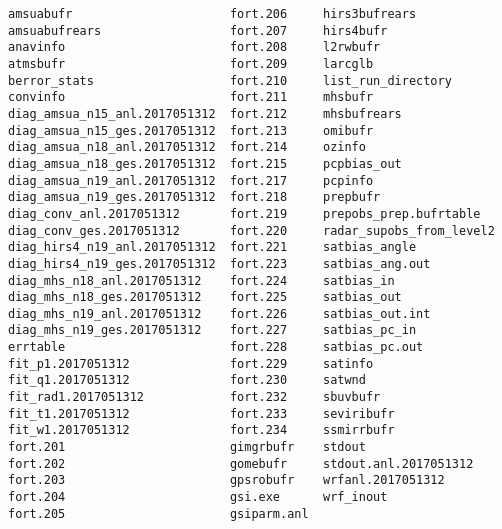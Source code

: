 \begin{scriptsize}
\begin{verbatim}
amsuabufr                      fort.206     hirs3bufrears
amsuabufrears                  fort.207     hirs4bufr
anavinfo                       fort.208     l2rwbufr
atmsbufr                       fort.209     larcglb
berror_stats                   fort.210     list_run_directory
convinfo                       fort.211     mhsbufr
diag_amsua_n15_anl.2017051312  fort.212     mhsbufrears
diag_amsua_n15_ges.2017051312  fort.213     omibufr
diag_amsua_n18_anl.2017051312  fort.214     ozinfo
diag_amsua_n18_ges.2017051312  fort.215     pcpbias_out
diag_amsua_n19_anl.2017051312  fort.217     pcpinfo
diag_amsua_n19_ges.2017051312  fort.218     prepbufr
diag_conv_anl.2017051312       fort.219     prepobs_prep.bufrtable
diag_conv_ges.2017051312       fort.220     radar_supobs_from_level2
diag_hirs4_n19_anl.2017051312  fort.221     satbias_angle
diag_hirs4_n19_ges.2017051312  fort.223     satbias_ang.out
diag_mhs_n18_anl.2017051312    fort.224     satbias_in
diag_mhs_n18_ges.2017051312    fort.225     satbias_out
diag_mhs_n19_anl.2017051312    fort.226     satbias_out.int
diag_mhs_n19_ges.2017051312    fort.227     satbias_pc_in
errtable                       fort.228     satbias_pc.out
fit_p1.2017051312              fort.229     satinfo
fit_q1.2017051312              fort.230     satwnd
fit_rad1.2017051312            fort.232     sbuvbufr
fit_t1.2017051312              fort.233     seviribufr
fit_w1.2017051312              fort.234     ssmirrbufr
fort.201                       gimgrbufr    stdout
fort.202                       gomebufr     stdout.anl.2017051312
fort.203                       gpsrobufr    wrfanl.2017051312
fort.204                       gsi.exe      wrf_inout
fort.205                       gsiparm.anl
\end{verbatim}
\end{scriptsize}

